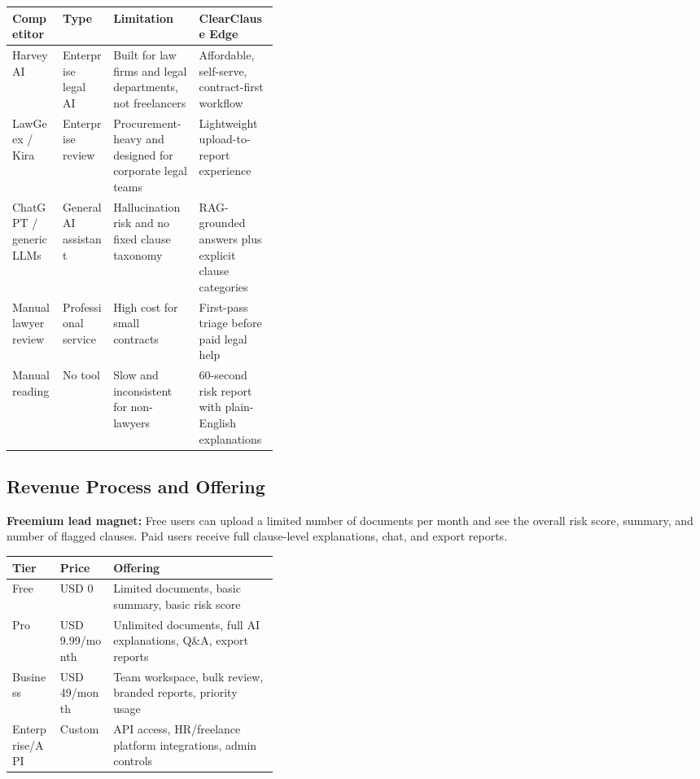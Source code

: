 \documentclass[11pt,a4paper]{article}
\begin{document}
\begin{tabularx}{\linewidth}{L{0.19\linewidth} L{0.19\linewidth} Y Y}
\toprule
\textbf{Competitor} & \textbf{Type} & \textbf{Limitation} & \textbf{ClearClause Edge} \\
\midrule
Harvey AI & Enterprise legal AI & Built for law firms and legal departments, not freelancers & Affordable, self-serve, contract-first workflow \\
LawGeex / Kira & Enterprise review & Procurement-heavy and designed for corporate legal teams & Lightweight upload-to-report experience \\
ChatGPT / generic LLMs & General AI assistant & Hallucination risk and no fixed clause taxonomy & RAG-grounded answers plus explicit clause categories \\
Manual lawyer review & Professional service & High cost for small contracts & First-pass triage before paid legal help \\
Manual reading & No tool & Slow and inconsistent for non-lawyers & 60-second risk report with plain-English explanations \\
\bottomrule
\end{tabularx}

\subsection{Revenue Process and Offering}

\textbf{Freemium lead magnet:} Free users can upload a limited number of documents per month and see the overall risk score, summary, and number of flagged clauses. Paid users receive full clause-level explanations, chat, and export reports.

\begin{tabularx}{\linewidth}{L{0.18\linewidth} L{0.2\linewidth} Y}
\toprule
\textbf{Tier} & \textbf{Price} & \textbf{Offering} \\
\midrule
Free & USD 0 & Limited documents, basic summary, basic risk score \\
Pro & USD 9.99/month & Unlimited documents, full AI explanations, Q\&A, export reports \\
Business & USD 49/month & Team workspace, bulk review, branded reports, priority usage \\
Enterprise/API & Custom & API access, HR/freelance platform integrations, admin controls \\
\bottomrule
\end{tabularx}
\end{document}
